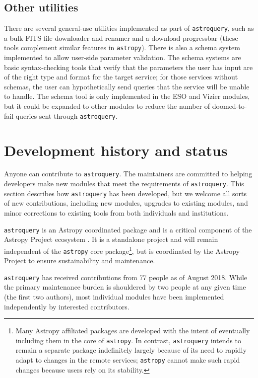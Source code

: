 \documentclass[twocolumn]{aastex62}
\newcommand{\package}[1]{\texttt{#1}\xspace}
\newcommand{\astroquery}{\package{astroquery}}
\newcommand{\astropy}{Astropy\xspace}
\newcommand{\astropypkg}{\package{astropy}}
\begin{document}
\subsection{Other utilities}
There are several general-use utilities implemented as part of \astroquery, such
as a bulk FITS file downloader and renamer and a download progressbar (these
tools complement similar features in \astropypkg).  There
is also a schema system implemented to allow user-side parameter validation.
The schema systems are basic syntax-checking tools that verify that the parameters
the user has input are of the right type and format for the target service;
for those services without schemas, the user can hypothetically send queries
that the service will be unable to handle.
The schema tool is only implemented in the ESO and Vizier modules, but it could
be expanded to other modules to reduce the number of doomed-to-fail queries
sent through \astroquery.

\section{Development history and status}
\label{sec:development}
Anyone can contribute to \astroquery.  The maintainers are committed to helping
developers make new modules that meet the requirements of \astroquery.  This
section describes how \astroquery has been developed, but we welcome all sorts
of new contributions, including new modules, upgrades to existing modules, and
minor corrections to existing tools from both individuals and institutions.

\astroquery is an \astropy coordinated package \citep{APE15} and is a critical
component of the \astropy Project ecosystem \citep{Astropy-Collaboration2018}.
It is a standalone project and will remain independent of the \astropypkg core
package\footnote{Many \astropy affiliated packages are developed with the
intent of eventually including them in the core of \astropypkg.  In contrast,
\astroquery intends to remain a separate package indefinitely largely because
of its need to rapidly adapt to changes in the remote services; \astropypkg
cannot make such rapid changes because users rely on its stability.}, but is
coordinated by the \astropy Project to ensure sustainability and maintenance.

\astroquery has received contributions from 77 people as of August 2018.  While the primary maintenance
burden is shouldered by two people at any given time (the first two authors),
most individual modules have been implemented independently by interested
contributors.
\end{document}
